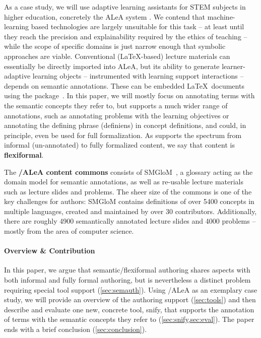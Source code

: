 \documentclass[runningheads]{llncs}
\newcommand\ALeA{\textsf{ALeA}\xspace}
\newcommand\SMGloM{\textsf{SMGloM}\xspace}
\newcommand\snify{\textsf{snify}\xspace}
\begin{document}
As a case study, we will use adaptive learning assistants for STEM subjects in higher education, concretely the \ALeA system \cite{BerBetChu:lssmkm23}.
We contend that machine-learning based technologies are largely unsuitable for this task -- at least until they reach the
precision and explainability required by the ethics of teaching --
while the scope of specific domains is just narrow enough that symbolic approaches are viable.
Conventional (\LaTeX-based) lecture materials can essentially be directly imported into \ALeA,
but its ability to generate learner-adaptive learning objects -- instrumented with learning support interactions --
depends on semantic annotations.
These can be embedded \LaTeX\ documents using the \sTeX package~\cite{MueKo:sdstex22,sTeX:github:on}.
In this paper, we will mostly focus on annotating terms with the semantic concepts they refer to,
but \sTeX supports a much wider range of annotations, such as annotating problems with the learning objectives
or annotating the defining phrase (definiens) in concept definitions,
and could, in principle, even be used for full formalization.
As \sTeX supports the spectrum from informal (un-annotated) to fully formalized content,
we say that \sTeX content is \textbf{flexiformal}.

The \textbf{\sTeX/\ALeA content commons} consists of \SMGloM~\cite{GinIanJuc:spsttom16},
a glossary acting as the domain model for semantic annotations,
as well as re-usable lecture materials such as lecture slides and problems.
The sheer size
of the commons is one of the key challenges for authors: \SMGloM contains definitions of over
5400 concepts in multiple languages, created and maintained by over 30
contributors.  Additionally, there are roughly 4900
semantically annotated lecture slides and 4000 problems
-- mostly from the area of computer science.

% 

\paragraph{Overview \& Contribution}
In this paper, we argue that semantic/flexiformal authoring shares aspects with both informal and fully formal authoring,
but is nevertheless a distinct problem requiring special tool support (\cref{sec:semauth}).
Using \sTeX/\ALeA as an exemplary case study,
we will provide an overview of the authoring support (\cref{sec:tools})
and then describe and evaluate one new, concrete tool, \snify, that supports the annotation
of terms with the semantic concepts they refer to (\cref{sec:snify,sec:eval}).
The paper ends with a brief conclusion (\cref{sec:conclusion}).
\end{document}
